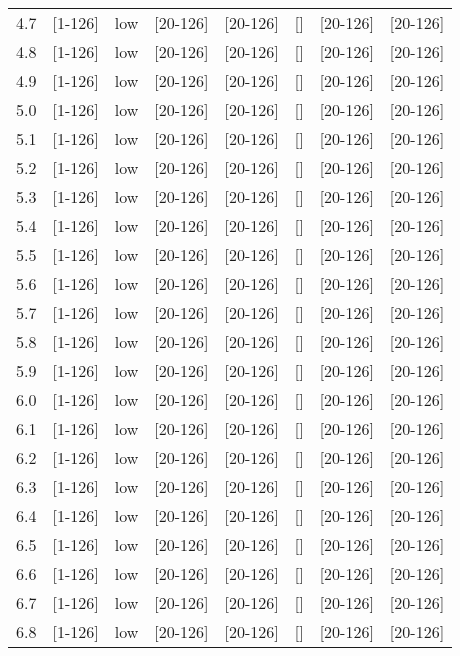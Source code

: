 \documentclass{article}
\begin{document}
\begin{tabular}{ l | l | l | l | l }
      4.7 & [1-126] & low & [20-126] & [20-126] & [] & [20-126] & [20-126] &\\
      4.8 & [1-126] & low & [20-126] & [20-126] & [] & [20-126] & [20-126] &\\
      4.9 & [1-126] & low & [20-126] & [20-126] & [] & [20-126] & [20-126] &\\
      5.0 & [1-126] & low & [20-126] & [20-126] & [] & [20-126] & [20-126] &\\
      5.1 & [1-126] & low & [20-126] & [20-126] & [] & [20-126] & [20-126] &\\
      5.2 & [1-126] & low & [20-126] & [20-126] & [] & [20-126] & [20-126] &\\
      5.3 & [1-126] & low & [20-126] & [20-126] & [] & [20-126] & [20-126] &\\
      5.4 & [1-126] & low & [20-126] & [20-126] & [] & [20-126] & [20-126] &\\
      5.5 & [1-126] & low & [20-126] & [20-126] & [] & [20-126] & [20-126] &\\
      5.6 & [1-126] & low & [20-126] & [20-126] & [] & [20-126] & [20-126] &\\
      5.7 & [1-126] & low & [20-126] & [20-126] & [] & [20-126] & [20-126] &\\
      5.8 & [1-126] & low & [20-126] & [20-126] & [] & [20-126] & [20-126] &\\
      5.9 & [1-126] & low & [20-126] & [20-126] & [] & [20-126] & [20-126] &\\
      6.0 & [1-126] & low & [20-126] & [20-126] & [] & [20-126] & [20-126] &\\
      6.1 & [1-126] & low & [20-126] & [20-126] & [] & [20-126] & [20-126] &\\
      6.2 & [1-126] & low & [20-126] & [20-126] & [] & [20-126] & [20-126] &\\
      6.3 & [1-126] & low & [20-126] & [20-126] & [] & [20-126] & [20-126] &\\
      6.4 & [1-126] & low & [20-126] & [20-126] & [] & [20-126] & [20-126] &\\
      6.5 & [1-126] & low & [20-126] & [20-126] & [] & [20-126] & [20-126] &\\
      6.6 & [1-126] & low & [20-126] & [20-126] & [] & [20-126] & [20-126] &\\
      6.7 & [1-126] & low & [20-126] & [20-126] & [] & [20-126] & [20-126] &\\
      6.8 & [1-126] & low & [20-126] & [20-126] & [] & [20-126] & [20-126] &\\

\end{tabular}
\end{document}
